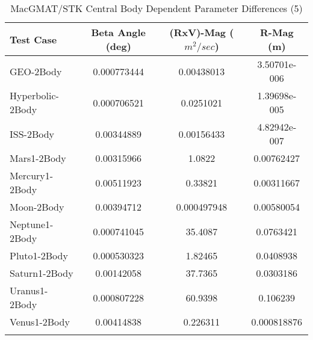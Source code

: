 \begin{table}[htbp!]
\centering
\caption{ MacGMAT/STK Central Body Dependent Parameter Differences (5)}
      \begin{tabular}{lccc}
      \hline\hline
          Test Case & Beta Angle (deg) & (RxV)-Mag ($m^2/sec$) & R-Mag (m) \\
         \hline
         GEO-2Body & 0.000773444 & 0.00438013 & 3.50701e-006 \\
         Hyperbolic-2Body & 0.000706521 & 0.0251021 & 1.39698e-005 \\
         ISS-2Body & 0.00344889 & 0.00156433 & 4.82942e-007 \\
         Mars1-2Body & 0.00315966 & 1.0822 & 0.00762427 \\
         Mercury1-2Body & 0.00511923 & 0.33821 & 0.00311667 \\
         Moon-2Body & 0.00394712 & 0.000497948 & 0.00580054 \\
         Neptune1-2Body & 0.000741045 & 35.4087 & 0.0763421 \\
         Pluto1-2Body & 0.000530323 & 1.82465 & 0.0408938 \\
         Saturn1-2Body & 0.00142058 & 37.7365 & 0.0303186 \\
         Uranus1-2Body & 0.000807228 & 60.9398 & 0.106239 \\
         Venus1-2Body & 0.00414838 & 0.226311 & 0.000818876 \\
      \hline\hline
      \label{Table: MacGMAT-STK CB Parameters Set 5} 
\end{tabular}
\end{table}
